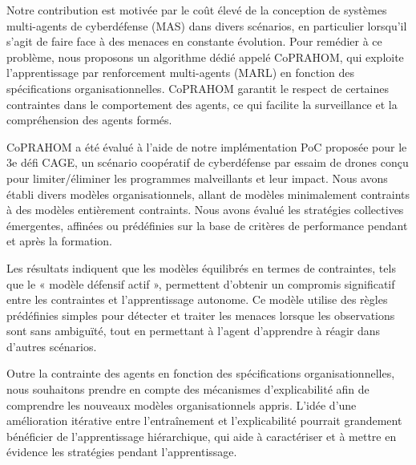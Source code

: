 Notre contribution est motivée par le coût élevé de la conception de systèmes multi-agents de cyberdéfense (MAS) dans divers scénarios, en particulier lorsqu'il s'agit de faire face à des menaces en constante évolution. Pour remédier à ce problème, nous proposons un algorithme dédié appelé CoPRAHOM, qui exploite l'apprentissage par renforcement multi-agents (MARL) en fonction des spécifications organisationnelles. CoPRAHOM garantit le respect de certaines contraintes dans le comportement des agents, ce qui facilite la surveillance et la compréhension des agents formés.

CoPRAHOM a été évalué à l'aide de notre implémentation PoC proposée pour le 3e défi CAGE, un scénario coopératif de cyberdéfense par essaim de drones conçu pour limiter/éliminer les programmes malveillants et leur impact. Nous avons établi divers modèles organisationnels, allant de modèles minimalement contraints à des modèles entièrement contraints. Nous avons évalué les stratégies collectives émergentes, affinées ou prédéfinies sur la base de critères de performance pendant et après la formation.

Les résultats indiquent que les modèles équilibrés en termes de contraintes, tels que le « modèle défensif actif », permettent d'obtenir un compromis significatif entre les contraintes et l'apprentissage autonome. Ce modèle utilise des règles prédéfinies simples pour détecter et traiter les menaces lorsque les observations sont sans ambiguïté, tout en permettant à l'agent d'apprendre à réagir dans d'autres scénarios.

Outre la contrainte des agents en fonction des spécifications organisationnelles, nous souhaitons prendre en compte des mécanismes d'explicabilité afin de comprendre les nouveaux modèles organisationnels appris. L'idée d'une amélioration itérative entre l'entraînement et l'explicabilité pourrait grandement bénéficier de l'apprentissage hiérarchique, qui aide à caractériser et à mettre en évidence les stratégies pendant l'apprentissage.

